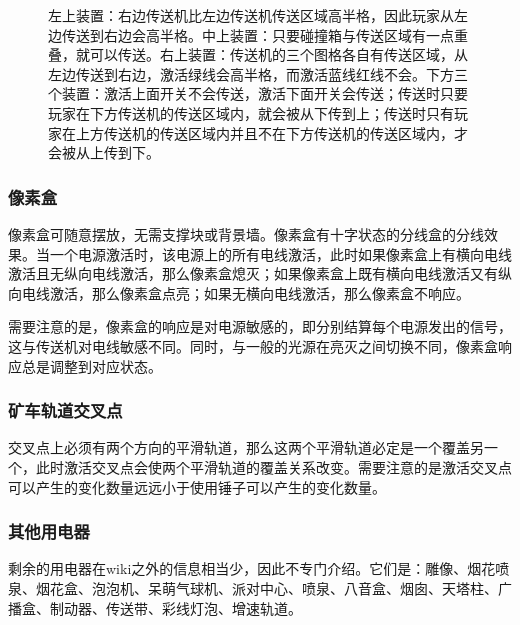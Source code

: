 \begin{figure}[!h]
\begin{center}
\qquad
{}
\end{center}
\caption{左上装置：右边传送机比左边传送机传送区域高半格，因此玩家从左边传送到右边会高半格。中上装置：只要碰撞箱与传送区域有一点重叠，就可以传送。右上装置：传送机的三个图格各自有传送区域，从左边传送到右边，激活绿线会高半格，而激活蓝线红线不会。下方三个装置：激活上面开关不会传送，激活下面开关会传送；传送时只要玩家在下方传送机的传送区域内，就会被从下传到上；传送时只有玩家在上方传送机的传送区域内并且不在下方传送机的传送区域内，才会被从上传到下。}
\label{i217:218}
\end{figure}

\subsubsection{像素盒}
像素盒可随意摆放，无需支撑块或背景墙。像素盒有十字状态的分线盒的分线效果。当一个电源激活时，该电源上的所有电线激活，此时如果像素盒上有横向电线激活且无纵向电线激活，那么像素盒熄灭；如果像素盒上既有横向电线激活又有纵向电线激活，那么像素盒点亮；如果无横向电线激活，那么像素盒不响应。

需要注意的是，像素盒的响应是对电源敏感的，即分别结算每个电源发出的信号，这与传送机对电线敏感不同。同时，与一般的光源在亮灭之间切换不同，像素盒响应总是调整到对应状态。

\subsubsection{矿车轨道交叉点}
交叉点上必须有两个方向的平滑轨道，那么这两个平滑轨道必定是一个覆盖另一个，此时激活交叉点会使两个平滑轨道的覆盖关系改变。需要注意的是激活交叉点可以产生的变化数量远远小于使用锤子可以产生的变化数量。

\subsubsection{其他用电器}
剩余的用电器在wiki之外的信息相当少，因此不专门介绍。它们是：雕像、烟花喷泉、烟花盒、泡泡机、呆萌气球机、派对中心、喷泉、八音盒、烟囱、天塔柱、广播盒、制动器、传送带、彩线灯泡、增速轨道。